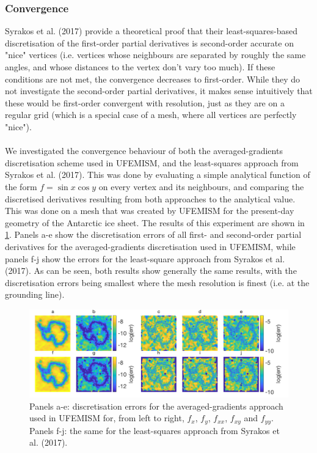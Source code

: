 \documentclass{article}
\begin{document}
\subsubsection{Convergence}

Syrakos et al. (2017) provide a theoretical proof that their least-squares-based discretisation of the first-order partial derivatives is second-order accurate on "nice" vertices (i.e. vertices whose neighbours are separated by roughly the same angles, and whose distances to the vertex don't vary too much). If these conditions are not met, the convergence decreases to first-order. While they do not investigate the second-order partial derivatives, it makes sense intuitively that these would be first-order convergent with resolution, just as they are on a regular grid (which is a special case of a mesh, where all vertices are perfectly "nice").\\
\\
We investigated the convergence behaviour of both the averaged-gradients discretisation scheme used in UFEMISM, and the least-squares approach from Syrakos et al. (2017). This was done by evaluating a simple analytical function of the form $f=\sin{x}\cos{y}$ on every vertex and its neighbours, and comparing the discretised derivatives resulting from both approaches to the analytical value. This was done on a mesh that was created by UFEMISM for the present-day geometry of the Antarctic ice sheet. The results of this experiment are shown in \ref{fig:disc_conv_maps}. Panels a-e show the discretisation errors of all first- and second-order partial derivatives for the averaged-gradients discretisation used in UFEMISM, while panels f-j show the errors for the least-square approach from Syrakos et al. (2017). As can be seen, both results show generally the same results, with the discretisation errors being smallest where the mesh resolution is finest (i.e. at the grounding line).

\begin{figure}[h!] \label{fig:disc_conv_maps}
  \includegraphics[width=0.9\linewidth]{Fig_discretisation_convergence_maps.png}
  \caption{Panels a-e: discretisation errors for the averaged-gradients approach used in UFEMISM for, from left to right, $f_x$, $f_y$, $f_{xx}$, $f_{xy}$ and $f_{yy}$. Panels f-j: the same for the least-squares approach from Syrakos et al. (2017).}
\end{figure}
\end{document}
